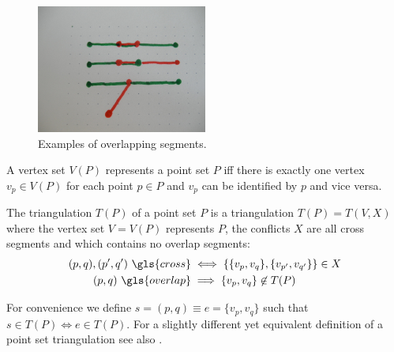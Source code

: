 \begin{figure}[ht]
  \centering
  \includegraphics[width=0.5\textwidth]{img/example_overlapping.jpg}
  \caption{Examples of overlapping segments.}
\end{figure}


\begin{definition}
  A vertex set \(V(P)\) represents a point set \(P\) iff there
  is exactly one vertex \(v_p \in V(P)\) for each point \(p \in P\)
  and \(v_p\) can be identified by \(p\) and vice versa.
%   
\end{definition}

\begin{definition}
  \label{def:point_set_triangulation}
  The triangulation \(T(P)\) of a point set \(P\) is a triangulation
  \(T(P) = T(V,X)\) where the vertex set
  \(V=V(P)\) represents \(P\), the conflicts \(X\) are all
  \gls{cross} segments and which contains no \gls{overlap} segments:
  \begin{alignat*}{1}
    (p,q), (p',q')~\gls{cross}
    &\iff \left\{ \{v_p,v_q\}, \{v_{p'},v_{q'}\} \right\} \in X \\
     (p,q)~\gls{overlap}
    &\implies \{v_p,v_q\} \not\in T(P)
  \end{alignat*}

  For convenience we define \(s=(p,q) \equiv e=\{v_p,v_q\}\) such
  that \(s \in T(P) \iff e \in T(P)\). For a slightly different yet
  equivalent definition of a point set triangulation see also
  \cite[Section 9.1]{deberg_compgeom}.
\end{definition}

